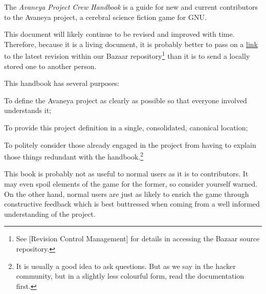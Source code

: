 

The {\it Avaneya Project Crew Handbook} is a guide for new and current contributors to the Avaneya project, a cerebral science fiction game for GNU. 

This document will likely continue to be revised and improved with time. Therefore, because it is a living document, it is probably better to pass on a \href{http://bazaar.launchpad.net/~avaneya/avaneya/trunk/view/head:/Documentation/Contributors/Handbook/Avaneya\%20Project\%20Crew\%20Handbook.pdf}{link} to the latest revision within our Bazaar repository\footnote[]{See [Revision Control Management] for details in accessing the Bazaar source repository.} than it is to send a locally stored one to another person.

This handbook has several purposes:

\startitemize[R]
\item
To define the Avaneya project as clearly as possible so that everyone involved understands it;

\item
To provide this project definition in a single, consolidated, canonical location;

\item
To politely consider those already engaged in the project from having to explain those things redundant with the handbook.\footnote[rtfm]{It is usually a good idea to ask questions. But as we say in the hacker community, but in a slightly less colourful form, read the documentation first.}
\stopitemize

This book is probably not as useful to normal users as it is to contributors. It may even spoil elements of the game for the former, so consider yourself warned. On the other hand, normal users are just as likely to enrich the game through constructive feedback which is best buttressed when coming from a well informed understanding of the project.

\StopChapter

